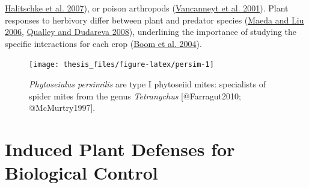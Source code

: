 \documentclass[12pt,final,CPage]{ufthesis}
\begin{document}
{\protect\hyperlink{ref-Halitschke2007}{Halitschke et al. 2007}), or poison arthropods (\protect\hyperlink{ref-Vancanneyt2001}{Vancanneyt et al. 2001}). Plant responses to herbivory differ between plant and predator species (\protect\hyperlink{ref-Maeda2006}{Maeda and Liu 2006}, \protect\hyperlink{ref-Qualley2008}{Qualley and Dudareva 2008}), underlining the importance of studying the specific interactions for each crop (\protect\hyperlink{ref-Boom2004}{Boom et al. 2004}).
  \begin{figure}

  {\centering \texttt{[image: thesis\_files/figure-latex/persim-1]} 

  }

  \caption[\textit{Phytoseiulus persimilis} are type I phytoseiid mites]{\textit{Phytoseiulus persimilis} are type I phytoseiid mites: specialists of spider mites from the genus \textit{Tetranychus} [@Farragut2010; @McMurtry1997].}\label{fig:persim}
  \end{figure}
  \hypertarget{litrev-plantdef}{%
  \section{Induced Plant Defenses for Biological Control}\label{litrev-plantdef}}

}
\end{document}
